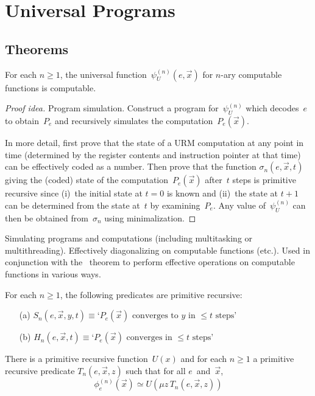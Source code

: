 %
%
%
\section{Universal Programs}
\subsection*{Theorems}
\begin{thm}
For each \(n\ge1\), the universal function~\(\psi_U^{(n)}(e,\vec{x})\) for \(n\)-ary computable functions is computable.
\end{thm}
\begin{proof}[Proof idea]
Program simulation. Construct a program for~\(\psi_U^{(n)}\) which decodes~\(e\) to obtain~\(P_e\) and recursively simulates the computation~\(P_e(\vec{x})\).

In more detail, first prove that the state of a URM computation at any point in time (determined by the register contents and instruction pointer at that time) can be effectively coded as a number. Then prove that the function \(\sigma_n(e,\vec{x},t)\) giving the (coded) state of the computation~\(P_e(\vec{x})\) after~\(t\) steps is primitive recursive since (i)~the initial state at \(t=0\) is known and (ii)~the state at \(t+1\) can be determined from the state at~\(t\) by examining~\(P_e\). Any value of~\(\psi_U^{(n)}\) can then be obtained from~\(\sigma_n\) using minimalization.
\end{proof}
\begin{app}
Simulating programs and computations (including multitasking or multithreading). Effectively diagonalizing on computable functions (etc.). Used in conjunction with the \smn\ theorem to perform effective operations on computable functions in various ways.
\end{app}
\begin{cor}
For each \(n\ge 1\), the following predicates are primitive recursive:
\begin{enumerate}[itemsep=0pt]
\item[(a)] \(S_n(e,\vec{x},y,t)\equiv \text{`}P_e(\vec{x})\text{ converges to }y\text{ in }\le t\text{ steps'}\)
\item[(b)] \(H_n(e,\vec{x},t)\equiv \text{`}P_e(\vec{x})\text{ converges in }\le t\text{ steps'}\)
\end{enumerate}
\end{cor}
\begin{cor}
There is a primitive recursive function~\(U(x)\) and for each \(n\ge1\) a primitive recursive predicate \(T_n(e,\vec{x},z)\) such that for all \(e\)~and~\(\vec{x}\),
\[\phi_e^{(n)}(\vec{x})\simeq U(\mu z\, T_n(e,\vec{x},z))\]
\end{cor}
